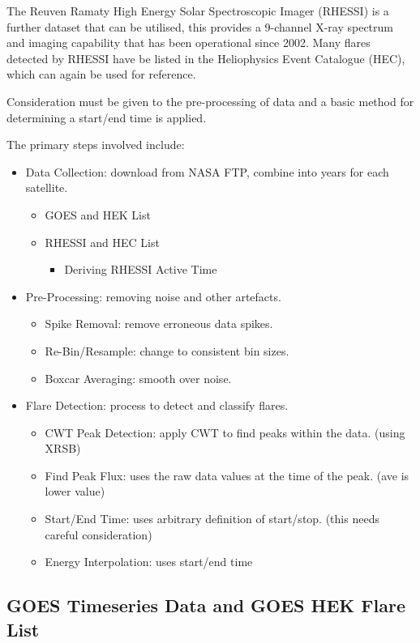 \documentclass[namedreferences]{solarphysics}
\begin{document}
\begin{article}
The Reuven Ramaty High Energy Solar Spectroscopic Imager (RHESSI) is a further dataset that can be utilised, this provides a 9-channel X-ray spectrum and imaging capability that has been operational since 2002. Many flares detected by RHESSI have be listed in the Heliophysics Event Catalogue (HEC), which can again be used for reference.

Consideration must be given to the pre-processing of data and a basic method for determining a start/end time is applied.

The primary steps involved include:

\begin{itemize}
	\item Data Collection: download from NASA FTP, combine into years for each satellite.
	\begin{itemize}
		\item GOES and HEK List
		\item RHESSI and HEC List
		\begin{itemize}
			\item Deriving RHESSI Active Time
		\end{itemize}
	\end{itemize}
	\item Pre-Processing: removing noise and other artefacts.
	\begin{itemize}
		\item Spike Removal: remove erroneous data spikes.
		\item Re-Bin/Resample: change to consistent bin sizes.
		\item Boxcar Averaging: smooth over noise.
	\end{itemize}
	\item Flare Detection: process to detect and classify flares.
	\begin{itemize}
		\item CWT Peak Detection: apply CWT to find peaks within the data. (using XRSB)
		\item Find Peak Flux: uses the raw data values at the time of the peak. (ave is lower value)
		\item Start/End Time: uses arbitrary definition of start/stop. (this needs careful consideration)
		\item Energy Interpolation: uses start/end time
	\end{itemize}
\end{itemize}


\subsection{GOES Timeseries Data and GOES HEK Flare List} %
     \label{S-GOES-HEK}


\end{article}
\end{document}
